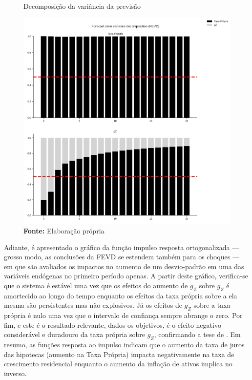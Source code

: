 \begin{figure}[htb]
	\centering
	\caption{Decomposição da variância da previsão}
	\label{fevd}
	\includegraphics[width=\textwidth]{../../Modelo/SeriesTemporais/figs/FEVD_VECMpython_TxPropria.png}
	\caption*{\textbf{Fonte:} Elaboração própria}
\end{figure}


Adiante, é apresentado o gráfico da função impulso resposta ortogonalizada --- grosso modo, as conclusões da FEVD se estendem também para os choques --- em que são avaliados os impactos no aumento de um desvio-padrão em uma das variáveis endógenas no primeiro período apenas.
A partir deste gráfico, verifica-se que o sistema é estável uma vez que os efeitos do aumento de $g_Z$ sobre $g_Z$ é amortecido ao longo do tempo enquanto os efeitos da taxa própria sobre a ela mesma são persistentes mas não explosivos.
Já os efeitos de $g_Z$ sobre a taxa própria é nulo uma vez que o intervalo de confiança sempre abrange o zero. Por fim, e este é o resultado relevante, dados os objetivos, é o efeito negativo considerável e duradouro da taxa própria sobre $g_Z$, confirmando a tese de \textcite{teixeira_crescimento_2015}.
Em resumo, as funções resposta ao impulso indicam que o aumento da taxa de juros das hipotecas (aumento na Taxa Própria) impacta negativamente na taxa de crescimento residencial enquanto o aumento da inflação de ativos implica no inverso. 


